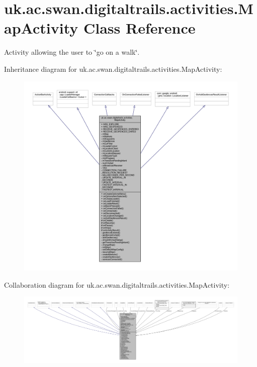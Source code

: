 \hypertarget{classuk_1_1ac_1_1swan_1_1digitaltrails_1_1activities_1_1_map_activity}{\section{uk.\+ac.\+swan.\+digitaltrails.\+activities.\+Map\+Activity Class Reference}
\label{classuk_1_1ac_1_1swan_1_1digitaltrails_1_1activities_1_1_map_activity}
}


Activity allowing the user to \char`\"{}go on a walk\char`\"{}.  




Inheritance diagram for uk.\+ac.\+swan.\+digitaltrails.\+activities.\+Map\+Activity\+:
\nopagebreak
\begin{figure}[H]
\begin{center}
\leavevmode
\includegraphics[width=350pt]{classuk_1_1ac_1_1swan_1_1digitaltrails_1_1activities_1_1_map_activity__inherit__graph}
\end{center}
\end{figure}


Collaboration diagram for uk.\+ac.\+swan.\+digitaltrails.\+activities.\+Map\+Activity\+:
\nopagebreak
\begin{figure}[H]
\begin{center}
\leavevmode
\includegraphics[width=350pt]{classuk_1_1ac_1_1swan_1_1digitaltrails_1_1activities_1_1_map_activity__coll__graph}
\end{center}
\end{figure}
